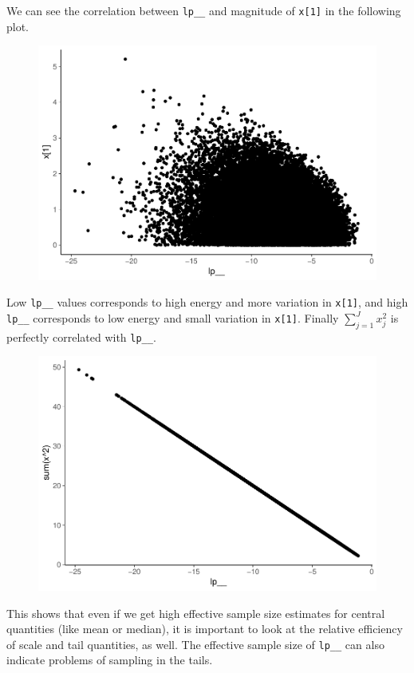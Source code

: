 \documentclass[american,]{article}
\begin{document}
We can see the correlation between \texttt{lp\_\_} and magnitude of
\texttt{x{[}1{]}} in the following plot.

\begin{figure}[t]
  \centering
  \includegraphics[width=0.6\linewidth]{graphics/qplot-fit-n-1.pdf}
\end{figure}

Low \texttt{lp\_\_} values corresponds to high energy and more variation
in \texttt{x{[}1{]}}, and high \texttt{lp\_\_} corresponds to low energy
and small variation in \texttt{x{[}1{]}}. Finally \(\sum_{j=1}^J x_j^2\)
is perfectly correlated with \texttt{lp\_\_}.

\begin{figure}[t]
  \centering
  \includegraphics[width=0.6\linewidth]{graphics/qplot-fit-n-2-1.pdf}
\end{figure}

This shows that even if we get high effective sample size estimates for
central quantities (like mean or median), it is important to look at the
relative efficiency of scale and tail quantities, as well. The effective
sample size of \texttt{lp\_\_} can also indicate problems of sampling in
the tails.

\newpage

\hypertarget{refs}{}


\end{document}
